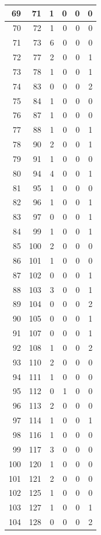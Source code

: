 \documentclass[
  letterpaper,
  DIV=11,
  numbers=noendperiod]{scrreprt}
\begin{document}
\begin{tabular}{r|r|r|r|r|r}
\hline
69 & 71 & 1 & 0 & 0 & 0\\
\hline
70 & 72 & 1 & 0 & 0 & 0\\
\hline
71 & 73 & 6 & 0 & 0 & 0\\
\hline
72 & 77 & 2 & 0 & 0 & 1\\
\hline
73 & 78 & 1 & 0 & 0 & 1\\
\hline
74 & 83 & 0 & 0 & 0 & 2\\
\hline
75 & 84 & 1 & 0 & 0 & 0\\
\hline
76 & 87 & 1 & 0 & 0 & 0\\
\hline
77 & 88 & 1 & 0 & 0 & 1\\
\hline
78 & 90 & 2 & 0 & 0 & 1\\
\hline
79 & 91 & 1 & 0 & 0 & 0\\
\hline
80 & 94 & 4 & 0 & 0 & 1\\
\hline
81 & 95 & 1 & 0 & 0 & 0\\
\hline
82 & 96 & 1 & 0 & 0 & 1\\
\hline
83 & 97 & 0 & 0 & 0 & 1\\
\hline
84 & 99 & 1 & 0 & 0 & 1\\
\hline
85 & 100 & 2 & 0 & 0 & 0\\
\hline
86 & 101 & 1 & 0 & 0 & 0\\
\hline
87 & 102 & 0 & 0 & 0 & 1\\
\hline
88 & 103 & 3 & 0 & 0 & 1\\
\hline
89 & 104 & 0 & 0 & 0 & 2\\
\hline
90 & 105 & 0 & 0 & 0 & 1\\
\hline
91 & 107 & 0 & 0 & 0 & 1\\
\hline
92 & 108 & 1 & 0 & 0 & 2\\
\hline
93 & 110 & 2 & 0 & 0 & 0\\
\hline
94 & 111 & 1 & 0 & 0 & 0\\
\hline
95 & 112 & 0 & 1 & 0 & 0\\
\hline
96 & 113 & 2 & 0 & 0 & 0\\
\hline
97 & 114 & 1 & 0 & 0 & 1\\
\hline
98 & 116 & 1 & 0 & 0 & 0\\
\hline
99 & 117 & 3 & 0 & 0 & 0\\
\hline
100 & 120 & 1 & 0 & 0 & 0\\
\hline
101 & 121 & 2 & 0 & 0 & 0\\
\hline
102 & 125 & 1 & 0 & 0 & 0\\
\hline
103 & 127 & 1 & 0 & 0 & 1\\
\hline
104 & 128 & 0 & 0 & 0 & 2\\

\end{tabular}
\end{document}
